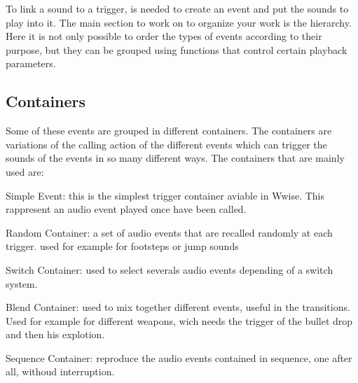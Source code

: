 To link a sound to a trigger, is needed to create an event and put the sounds to play into it. The main section to work on to organize your work is the hierarchy. Here it is not only possible to order the types of events according to their purpose, but they can be grouped using functions that control certain playback parameters.

	\subsection{Containers}
	Some of these events are grouped in different containers. The containers are variations of the calling action of the different events which can trigger the sounds of the events in so many different ways. The containers that are mainly used are:

	\begin{compactitem}
		\item Simple Event: this is the simplest trigger container aviable in Wwise. This rappresent an audio event played once have been called.
		\item Random Container:  a set of audio events that are recalled randomly at each trigger. used for example for footsteps or jump sounds
		\item Switch Container: used to select severals audio events depending of a switch system.
		\item Blend Container: used to mix together different events, useful in the transitions. Used for example for different weapons, wich needs the trigger of the bullet drop and then his explotion.
		\item Sequence Container: reproduce the audio events contained in sequence, one after all, withoud interruption.
	\end{compactitem}

